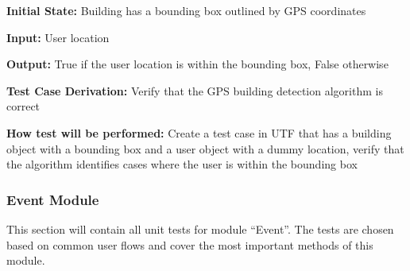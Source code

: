 \documentclass[12pt, titlepage]{article}
\begin{document}
\begin{enumerate}
\textbf{Initial State:} Building has a bounding box outlined by GPS coordinates

\textbf{Input:} User location
					
\textbf{Output:} True if the user location is within the bounding box, False otherwise

\textbf{Test Case Derivation:} Verify that the GPS building detection algorithm is correct

\textbf{How test will be performed:} Create a test case in UTF that has a building object with a bounding box and a user object with a dummy location, verify that the algorithm identifies cases where the user is within the bounding box

\end{enumerate}

\subsubsection{Event Module}

This section will contain all unit tests for module ``Event''. The tests are chosen based on common user flows and cover the most important methods of this module.
\end{document}
